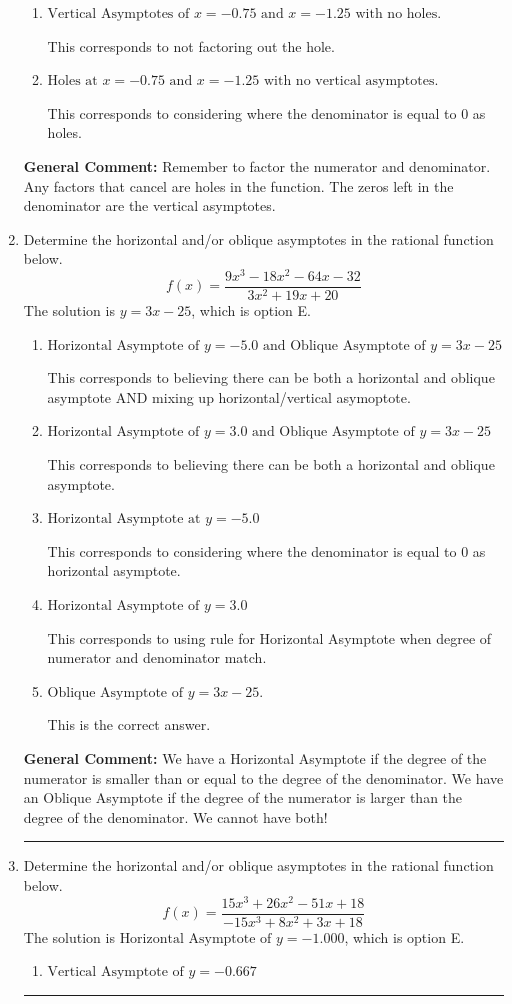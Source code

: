 \documentclass{extbook}[14pt]
\newcommand{\litem}[1]{\item #1

\rule{\textwidth}{0.4pt}}
\begin{document}
\begin{enumerate}
{\begin{enumerate}[label=\Alph*.]
This corresponds to mixing vertical and horizontal asymptotes.
\item \( \text{Vertical Asymptotes of } x = -0.75 \text{ and } x = -1.25 \text{ with no holes.} \)

This corresponds to not factoring out the hole.
\item \( \text{Holes at } x = -0.75 \text{ and } x = -1.25 \text{ with no vertical asymptotes.} \)

This corresponds to considering where the denominator is equal to 0 as holes.
\end{enumerate}

\textbf{General Comment:} Remember to factor the numerator and denominator. Any factors that cancel are holes in the function. The zeros left in the denominator are the vertical asymptotes.
}
\litem{
Determine the horizontal and/or oblique asymptotes in the rational function below.
\[ f(x) = \frac{9x^{3} -18 x^{2} -64 x -32}{3x^{2} +19 x + 20} \]The solution is \( y = 3x -25 \), which is option E.\begin{enumerate}[label=\Alph*.]
\item \( \text{Horizontal Asymptote of } y = -5.0 \text{ and Oblique Asymptote of } y = 3x -25 \)

This corresponds to believing there can be both a horizontal and oblique asymptote AND mixing up horizontal/vertical asymoptote.
\item \( \text{Horizontal Asymptote of } y = 3.0 \text{ and Oblique Asymptote of } y = 3x -25 \)

This corresponds to believing there can be both a horizontal and oblique asymptote.
\item \( \text{Horizontal Asymptote at } y = -5.0 \)

This corresponds to considering where the denominator is equal to 0 as horizontal asymptote.
\item \( \text{Horizontal Asymptote of } y = 3.0  \)

This corresponds to using rule for Horizontal Asymptote when degree of numerator and denominator match.
\item \( \text{Oblique Asymptote of } y = 3x -25. \)

This is the correct answer.
\end{enumerate}

\textbf{General Comment:} We have a Horizontal Asymptote if the degree of the numerator is smaller than or equal to the degree of the denominator. We have an Oblique Asymptote if the degree of the numerator is larger than the degree of the denominator. We cannot have both!
}
\litem{
Determine the horizontal and/or oblique asymptotes in the rational function below.
\[ f(x) = \frac{15x^{3} +26 x^{2} -51 x + 18}{-15x^{3} +8 x^{2} +3 x + 18} \]The solution is \( \text{Horizontal Asymptote of } y = -1.000  \), which is option E.\begin{enumerate}[label=\Alph*.]
\item \( \text{Vertical Asymptote of } y = -0.667  \)


\end{enumerate}}
\end{enumerate}
\end{document}
